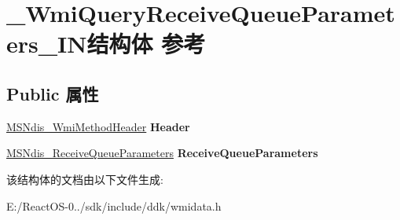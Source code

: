 \hypertarget{struct___wmi_query_receive_queue_parameters___i_n}{}\section{\+\_\+\+Wmi\+Query\+Receive\+Queue\+Parameters\+\_\+\+I\+N结构体 参考}
\label{struct___wmi_query_receive_queue_parameters___i_n}
\subsection*{Public 属性}
\begin{DoxyCompactItemize}
\item 
\mbox{\label{struct___wmi_query_receive_queue_parameters___i_n_a7e5d0428f95891d923a4824d73fa2714}} 
\hyperlink{struct___m_s_ndis___wmi_method_header}{M\+S\+Ndis\+\_\+\+Wmi\+Method\+Header} {\bfseries Header}
\item 
\mbox{\label{struct___wmi_query_receive_queue_parameters___i_n_a0c53528014420985bb5090d5ab617d39}} 
\hyperlink{struct___m_s_ndis___receive_queue_parameters}{M\+S\+Ndis\+\_\+\+Receive\+Queue\+Parameters} {\bfseries Receive\+Queue\+Parameters}
\end{DoxyCompactItemize}


该结构体的文档由以下文件生成\+:\begin{DoxyCompactItemize}
\item 
E\+:/\+React\+O\+S-\/0../sdk/include/ddk/wmidata.\+h\end{DoxyCompactItemize}
